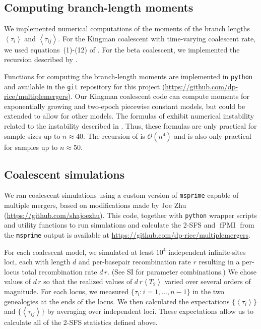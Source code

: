 \documentclass[11pt, letterpaper]{article}   	%
\newcommand{\E}[1]{\left< #1 \right>}
\DeclareMathOperator{\fpmi}{fPMI}
\begin{document}
\subsection*{Computing branch-length moments}

We implemented numerical computations of the moments of the branch lengths $\E{\tau_i}$ and $\E{\tau_{ij}}$.
For the Kingman coalescent with time-varying coalescent rate, we used equations~(1)-(12) of \textcite{ZivkovicWiehe2008}.
For the beta coalescent, we implemented the recursion described by \textcite{BirknerEtAl2013}.

Functions for computing the branch-length moments are implemented in \texttt{python} and available in the \texttt{git} repository for this project (\url{https://github.com/dp-rice/multiplemergers}).
Our Kingman coalescent code can compute moments for exponentially growing and two-epoch piecewise constant models, but could be extended to allow for other models.
The formulas of \textcite{ZivkovicWiehe2008} exhibit numerical instability related to the instability described in \textcite{GriffithsTavare1994}.
Thus, these formulas are only practical for sample sizes up to $n \approx 40$.
The recursion of \textcite{BirknerEtAl2013} is $\mathcal{O}(n^4)$ and is also only practical for samples up to $n \approx 50$.

\subsection*{Coalescent simulations}

We ran coalescent simulations using a custom version of \texttt{msprime} \autocite{KelleherEtAl2016} capable of multiple mergers, based on modifications made by Joe Zhu (\url{https://github.com/shajoezhu}).
This code, together with \texttt{python} wrapper scripts and utility functions to run simulations and calculate the 2-SFS and $\fpmi$ from the \texttt{msprime} output is available at \url{https://github.com/dp-rice/multiplemergers}.

For each coalescent model, we simulated at least $10^4$ independent infinite-sites loci, each with length $d$ and per-basepair recombination rate $r$ resulting in a per-locus total recombination rate $d\,r$.
(See SI for parameter combinations.)
We chose values of $d\,r$ so that the realized values of $d\,r \E{T_2}$ varied over several orders of magnitude.
For each locus, we measured $\{\tau_i : i = 1,\ldots,n-1\}$ in the two genealogies at the ends of the locus.
We then calculated the expectations $\{\E{\tau_i}\}$ and $\{\E{\tau_{ij}}\}$ by averaging over independent loci.
These expectations allow us to calculate all of the 2-SFS statistics defined above.
\end{document}
